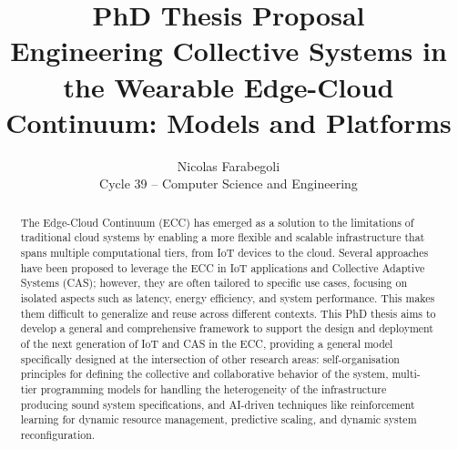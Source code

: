 \documentclass[runningheads]{llncs}
\begin{document}
%
\title{{\normalfont PhD Thesis Proposal}\\\vspace{0.1em}Engineering Collective Systems in the Wearable Edge-Cloud Continuum: Models and Platforms
}
%
%
\author{Nicolas Farabegoli\\Cycle 39 -- Computer Science and Engineering} %
%
%
%
\maketitle              %
%
\begin{abstract}
The Edge-Cloud Continuum (ECC) has emerged as a solution to the limitations of traditional cloud systems by enabling a more flexible and scalable infrastructure that spans multiple computational tiers,
from IoT devices to the cloud.
%
Several approaches have been proposed to leverage the ECC in IoT applications and Collective Adaptive Systems (CAS);
however,
they are often tailored to specific use cases,
focusing on isolated aspects such as latency,
energy efficiency,
and system performance.
%
This makes them difficult to generalize and reuse across different contexts.
%
This PhD thesis aims to develop a general and comprehensive framework to support the design and deployment of the next generation of IoT and CAS in the ECC,
providing a general model specifically designed at the intersection of other research areas:
self-organisation principles for defining the collective and collaborative behavior of the system,
multi-tier programming models for handling the heterogeneity of the infrastructure producing sound system specifications,
and AI-driven techniques like reinforcement learning for dynamic resource management,
predictive scaling,
and dynamic system reconfiguration.

\end{abstract}
\end{document}
